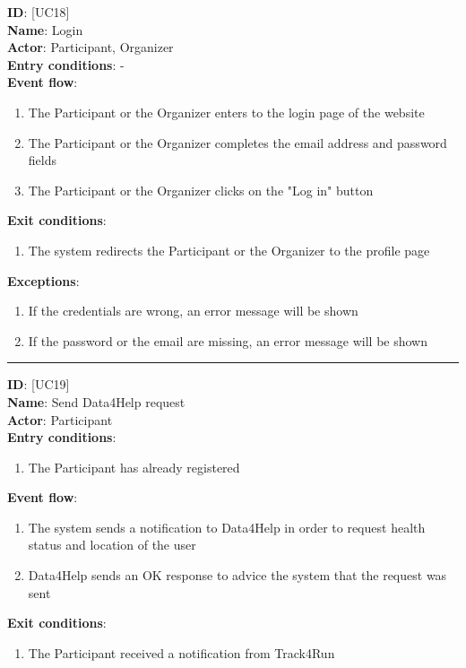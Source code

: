 \documentclass[12pt]{article}
\newcommand\usecase[1]{ [UC#1] }
\begin{document}
\begin{itemize}
  	\textbf{ID}: \usecase{18} \\
  	\textbf{Name}: Login \\
    \textbf{Actor}: Participant, Organizer \\
    \textbf{Entry conditions}: - \\
  	\textbf{Event flow}:
  		\begin{enumerate}
    			\item{The Participant or the Organizer enters to the login page of the website}
    			\item{The Participant or the Organizer completes the email address and password fields}
    			\item{The Participant or the Organizer clicks on the "Log in" button}
  		\end{enumerate}
  	\textbf{Exit conditions}:
  		\begin{enumerate}
    			\item{The system redirects the Participant or the Organizer to the profile page}
  		\end{enumerate}
  	\textbf{Exceptions}: 
  		\begin{enumerate}
    			\item{If the credentials are wrong, an error message will be shown}
    			\item{If the password or the email are missing, an error message will be shown}
  		\end{enumerate}
  	\rule{\linewidth}{0.4pt}
  	\textbf{ID}: \usecase{19} \\
  	\textbf{Name}: Send Data4Help request \\
    \textbf{Actor}: Participant \\
    \textbf{Entry conditions}: 
    		\begin{enumerate}
    			\item{The Participant has already registered}
    		\end{enumerate}
  	\textbf{Event flow}:
  		\begin{enumerate}
    			\item{The system sends a notification to Data4Help in order to request health status and location of the user}
    			\item{Data4Help sends an OK response to advice the system that the request was sent}
  		\end{enumerate}
  	\textbf{Exit conditions}:
  		\begin{enumerate}
    			\item{The Participant received a notification from Track4Run}

\end{enumerate}
\end{itemize}
\end{document}
